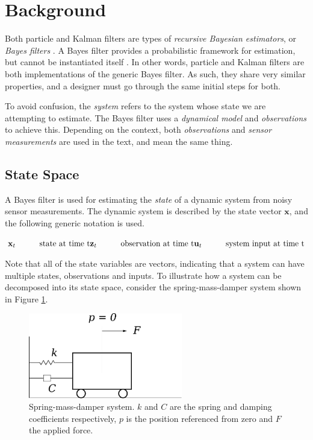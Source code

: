 \section{Background}\label{sec:background}

Both particle and Kalman filters are types of \emph{recursive Bayesian estimators},
or \emph{Bayes filters} \cite{ref:4}. A Bayes filter provides a probabilistic framework
for estimation, but cannot be instantiated itself \cite{ref:3}. In other words,
particle and Kalman filters are both implementations of the generic Bayes filter.
As such, they share very similar properties, and a designer must go through the
same initial steps for both.\cite{ref:4}

To avoid confusion, the \emph{system} refers to the system whose state we are
attempting to estimate. The Bayes filter uses a \emph{dynamical model} and
\emph{observations} to achieve this. Depending on the context, both
\emph{observations} and \emph{sensor measurements} are used in the text, and
mean the same thing.

\subsection{State Space}\label{sec:state-space}
A Bayes filter is used for estimating the \emph{state} of a dynamic system from
noisy sensor measurements. The dynamic system is described by the state
vector $\textbf{x}$, and the following generic notation is used.

\begin{math}
\mathbf{x}_{t}\quad\quad\quad\textrm{state at time t} \\
\mathbf{z}_{t}\quad\quad\quad\textrm{observation at time t} \\
\mathbf{u}_{t}\quad\quad\quad\textrm{system input at time t}
\end{math}

Note that all of the state variables are vectors, indicating that a system can
have multiple states, observations and inputs. To illustrate how a system can be
decomposed into its state space, consider the spring-mass-damper system shown in
Figure \ref{fig:spring-mass-damper}.

\begin{figure}[h]
\centering
\includegraphics[width=0.6\textwidth]{images/cart-system}
\caption{Spring-mass-damper system. $k$ and $C$ are the spring and damping
    coefficients respectively, $p$ is the position referenced from zero and $F$
    the applied force.
}
\label{fig:spring-mass-damper}
\end{figure}

